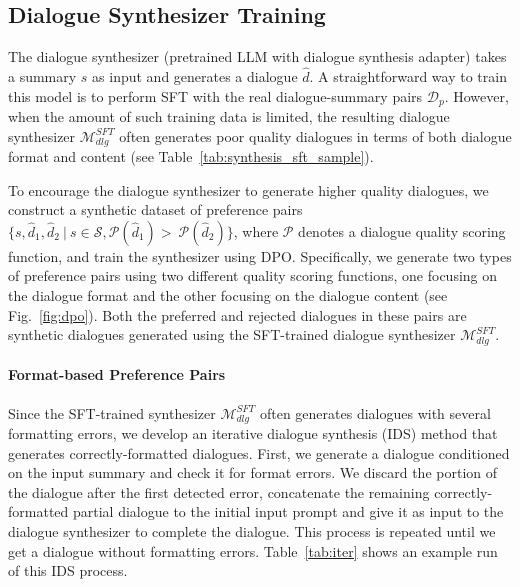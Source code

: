 \subsection{Dialogue Synthesizer Training}
\label{sec:dialogue}
The dialogue synthesizer (pretrained LLM with dialogue synthesis adapter) takes a summary $s$ as input and generates a dialogue $\hat{d}$. 
A straightforward way to train this model is to perform SFT with the real dialogue-summary pairs $\mathcal{D}_p$.
However, when the amount of such training data is limited, the resulting dialogue synthesizer $\mathcal{M}_{dlg}^{SFT}$ often generates poor quality dialogues in terms of both dialogue format and content (see Table~\ref{tab:synthesis_sft_sample}).


To encourage the dialogue synthesizer to generate higher quality dialogues, we construct a synthetic dataset of preference pairs $\{s, \hat{d}_1, \hat{d}_2\ |\ s \in \mathcal{S}, \mathcal{P}(\hat{d}_1) >\  \mathcal{P}(\hat{d}_2)\}$, where $\mathcal{P}$ denotes a dialogue quality scoring function, and train the synthesizer using DPO. Specifically, we generate two types of preference pairs using two different quality scoring functions, one focusing on the dialogue format and the other focusing on the dialogue content (see Fig.~\ref{fig:dpo}). Both the preferred and rejected dialogues in these pairs are synthetic dialogues generated using the SFT-trained dialogue synthesizer $\mathcal{M}_{dlg}^{SFT}$. 

 
\paragraph{Format-based Preference Pairs}
Since the SFT-trained synthesizer $\mathcal{M}_{dlg}^{SFT}$ often generates dialogues with several formatting errors, we develop an iterative dialogue synthesis (IDS) method that generates correctly-formatted dialogues.
First, we generate a dialogue conditioned on the input summary and check it for format errors. We discard the portion of the dialogue after the first detected error,
concatenate the remaining correctly-formatted partial dialogue to the initial input prompt and give it as input to the dialogue synthesizer to complete the dialogue. This process is repeated until we get a dialogue without formatting errors. Table~\ref{tab:iter} shows an example run of this IDS process. 

